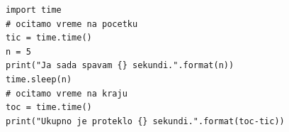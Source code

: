 \documentclass[a4paper]{article}
\begin{document}
\newpage

\begin{lstlisting}[caption={Primer profajliranja korišćenjem modula {\em time}.}, frame=single, label=lst:kod_time]
import time
# ocitamo vreme na pocetku
tic = time.time()
n = 5
print("Ja sada spavam {} sekundi.".format(n))
time.sleep(n)
# ocitamo vreme na kraju
toc = time.time()
print("Ukupno je proteklo {} sekundi.".format(toc-tic))
\end{lstlisting}

\begin{table}[h!]
 \begin{center}
 \label{table:performance}
\end{center}
\caption{Karakteristike računara.}
\end{table}
\end{document}
